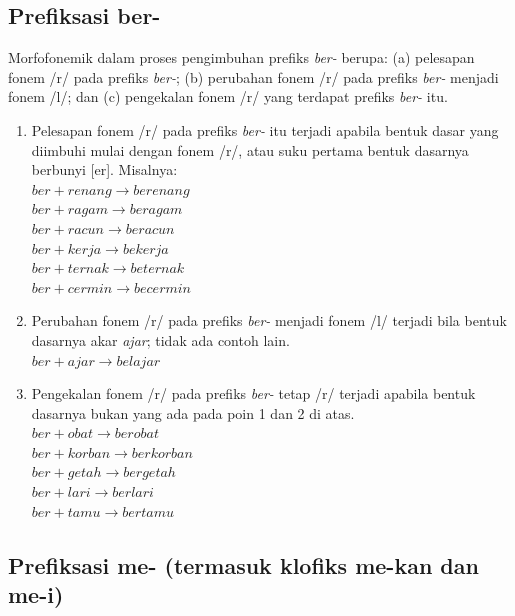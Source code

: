 \subsection{Prefiksasi ber-}
\label{sec:prefiksasiBer-}

Morfofonemik dalam proses pengimbuhan prefiks \textit{ber-} berupa: (a) pelesapan fonem /r/ pada prefiks \textit{ber-}; (b) perubahan fonem /r/ pada prefiks \textit{ber-} menjadi fonem /l/; dan (c) pengekalan fonem /r/ yang terdapat prefiks \textit{ber-} itu.

\begin{enumerate}
	\item Pelesapan fonem /r/ pada prefiks \textit{ber-} itu terjadi apabila bentuk dasar yang diimbuhi mulai dengan fonem /r/, atau suku pertama bentuk dasarnya berbunyi [er]. Misalnya:\\
	$ber + renang \rightarrow berenang$\\
	$ber + ragam \rightarrow beragam$\\
	$ber + racun \rightarrow beracun$\\
	$ber + kerja \rightarrow bekerja$\\
	$ber + ternak \rightarrow beternak$\\
	$ber + cermin \rightarrow becermin$
	
	\item Perubahan fonem /r/ pada prefiks \textit{ber-} menjadi fonem /l/ terjadi bila bentuk dasarnya akar \textit{ajar}; tidak ada contoh lain.\\
	$ber + ajar \rightarrow belajar$
	
	\item Pengekalan fonem /r/ pada prefiks \textit{ber-} tetap /r/ terjadi apabila bentuk dasarnya bukan yang ada pada poin 1 dan 2 di atas.\\
	$ber + obat \rightarrow berobat$\\
	$ber + korban \rightarrow berkorban$\\
	$ber + getah \rightarrow bergetah$\\
	$ber + lari \rightarrow berlari$\\
	$ber + tamu \rightarrow bertamu$
	
\end{enumerate}


\subsection{Prefiksasi me- (termasuk klofiks me-kan dan me-i)}
\label{sec:prefiksasiMe-}

